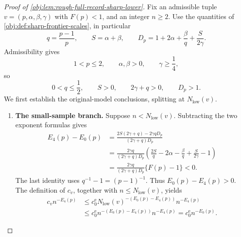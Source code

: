\documentclass[11pt]{article}
\begin{document}
\begin{proof}[Proof of \cref{obj:lem:rough-full-record-sharp-lower}]
Fix an admissible tuple \(v=(p,\alpha,\beta,\gamma)\) with \(F(p)<1\), and an integer \(n\ge2\). Use the quantities of \cref{obj:def:sharp-frontier-scales}, in particular
\[
q=\frac{p-1}{p},
\qquad S=\alpha+\beta,
\qquad
D_p=1+2\alpha+\frac{\beta}{q}+\frac{S}{2\gamma}.
\]
Admissibility gives
\[
1<p\le2,\qquad \alpha,\beta>0,\qquad \gamma\ge\frac14,
\]
so
\[
0<q\le\frac12,\qquad S>0,\qquad
2\gamma+q>0,\qquad D_p>1.
\]
We first establish the original-model conclusions, splitting at \(N_{\mathrm{low}}(v)\).

\begin{enumerate}
\item \textbf{The small-sample branch.}
Suppose \(n<N_{\mathrm{low}}(v)\). Subtracting the two exponent formulas gives
\[
\begin{aligned}
E_4(p)-E_0(p)
&=
\frac{2S(2\gamma+q)-2\gamma qD_p}
     {(2\gamma+q)D_p}\\
&=
\frac{2\gamma q}{(2\gamma+q)D_p}
\left(
\frac{2S}{q}-2\alpha-\frac{\beta}{q}
+\frac{S}{2\gamma}-1
\right)\\
&=
\frac{2\gamma q}{(2\gamma+q)D_p}\{F(p)-1\}<0.
\end{aligned}
\]
The last identity uses \(q^{-1}-1=(p-1)^{-1}\). Thus \(E_0(p)-E_4(p)>0\). The definition of \(c_v\), together with \(n\le N_{\mathrm{low}}(v)\), yields
\[
\begin{aligned}
c_vn^{-E_4(p)}
&\le
c_0^{\mathrm e}
N_{\mathrm{low}}(v)^{-(E_0(p)-E_4(p))}
n^{-E_4(p)}\\
&\le
c_0^{\mathrm e}
n^{-(E_0(p)-E_4(p))}n^{-E_4(p)}
=
c_0^{\mathrm e}n^{-E_0(p)}.
\end{aligned}
\]


\end{enumerate}
\end{proof}
\end{document}
